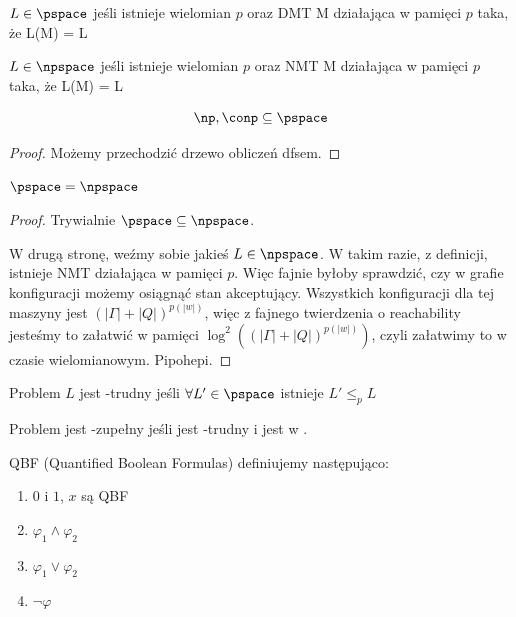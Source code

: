 \begin{definition}
	\(L \in \pspace\) jeśli istnieje wielomian \( p \) oraz DMT M działająca w pamięci \(p\) taka, że L(M) = L
\end{definition}

\begin{definition}
	\(L \in \npspace\) jeśli istnieje wielomian \( p \) oraz NMT M działająca w pamięci \(p\) taka, że L(M) = L
\end{definition}

\begin{lemma}
	\[ \np, \conp \subseteq \pspace \]
\end{lemma}
\begin{proof}
	Możemy przechodzić drzewo obliczeń dfsem.
\end{proof}

\begin{lemma}
	\( \pspace = \npspace \)
\end{lemma}

\begin{proof}
	Trywialnie \( \pspace \subseteq \npspace \).

	W drugą stronę, weźmy sobie jakieś \( L \in
	\npspace \). W takim razie, z definicji, istnieje NMT działająca w pamięci \(p\). Więc fajnie byłoby sprawdzić, czy w grafie konfiguracji możemy osiągnąć stan akceptujący. Wszystkich konfiguracji dla tej maszyny jest \( (|\Gamma| + |Q|)^{p(|w|)} \), więc z fajnego twierdzenia o reachability jesteśmy to załatwić w pamięci \( \log^2((|\Gamma| + |Q|)^{p(|w|)}) \), czyli załatwimy to w czasie wielomianowym. Pipohepi.
\end{proof}

\begin{definition}
	Problem \( L \) jest \pspace-trudny jeśli \(\forall L' \in \pspace \) istnieje \( L' \leq_{p} L \)
\end{definition}

\begin{definition}
	Problem jest \pspace-zupełny jeśli jest \pspace-trudny i jest w \pspace.
\end{definition}

\begin{definition}
	QBF (Quantified Boolean Formulas) definiujemy następująco:

	\begin{enumerate}
		\item \(0\) i \(1\), \(x\) są QBF
		\item \(\varphi_1 \land \varphi_2\)
		\item \(\varphi_1 \lor \varphi_2\)
		\item \(\lnot \varphi \)

	\end{enumerate}
\end{definition}

